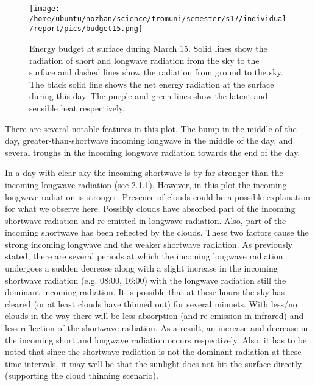 \documentclass[a4paper,12pt]{article}
\numberwithin{equation}{section} %
\begin{document}
\vspace{0.35cm}

\begin{figure}[bhp]
\texttt{[image: /home/ubuntu/nozhan/science/tromuni/semester/s17/individual/report/pics/budget15.png]}
\caption{Energy budget at surface during March 15. Solid lines show the radiation of short and longwave radiation from the sky to the surface and dashed lines show the radiation from ground to the sky. The black solid line shows the net energy radiation at the surface during this day. The purple and green lines show the latent and sensible heat respectively.}
\label{budget15}
\end{figure}

\vspace{1cm}

There are several notable features in this plot. The bump in the middle of the day, greater-than-shortwave incoming longwave in the middle of the day, and several troughs in the incoming longwave radiation towards the end of the day.

In a day with clear sky the incoming shortwave is by far stronger than the incoming longwave radiation (see 2.1.1). However, in this plot the incoming longwave radiation is stronger. Presence of clouds could be a possible explanation for what we observe here. Possibly clouds have absorbed part of the incoming shortwave radiation and re-emitted in longwave radiation. Also, part of the incoming shortwave has been reflected by the clouds. These two factors cause the strong incoming longwave and the weaker shortwave radiation. As previously stated, there are several periods at which the incoming longwave radiation undergoes a sudden decrease along with a slight increase in the incoming shortwave radiation (e.g. 08:00, 16:00) with the longwave radiation still the dominant incoming radiation. It is possible that at these hours the sky has cleared (or at least clouds have thinned out) for several minuets. With less/no clouds in the way there will be less absorption (and re-emission in infrared) and less reflection of the shortwave radiation. As a result, an increase and decrease in the incoming short and longwave radiation occurs respectively. Also, it has to be noted that since the shortwave radiation is not the dominant radiation at these time intervals, it may well be that the sunlight does not hit the surface directly (supporting the cloud thinning scenario).
\end{document}
